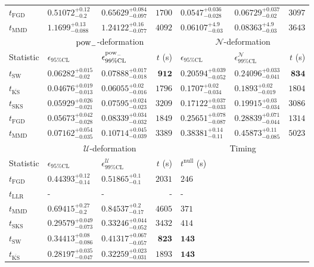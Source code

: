 \begin{tabular}{l|llr|llr}
	$t_{\mathrm{FGD}}$ & ${\mathbf{0.51072_{-0.2}^{+0.12}}}$ & ${\mathbf{0.65629_{-0.097}^{+0.084}}}$ & $1700$ & $0.0547_{-0.028}^{+0.036}$ & ${\mathbf{0.06729_{-0.02}^{+0.037}}}$ & $3097$ \\
	$t_{\mathrm{MMD}}$ & $1.1699_{-0.088}^{+0.13}$ & $1.24122_{-0.077}^{+0.16}$ & $4092$ & $0.06107_{-0.03}^{+4.9}$ & $0.08363_{-0.03}^{+4.9}$ & $3643$ \\
	\toprule
	\multicolumn{1}{c}{} & \multicolumn{3}{c}{$\rm{pow}_{-}$-deformation} & \multicolumn{3}{c}{$\mathcal{N}$-deformation} \\
	Statistic & $\epsilon_{95\%\mathrm{CL}}$ & $\epsilon^  {\rm{pow}_{-}}_{99\%\mathrm{CL}}$ & $t$ (s) & $\epsilon_{95\%\mathrm{CL}}$ & $\epsilon^    {\mathcal{N}}_{99\%\mathrm{CL}}$ & $t$ (s) \\
	\midrule
	$t_{\mathrm{SW}}$ & $0.06282_{-0.02}^{+0.015}$ & $0.07888_{-0.018}^{+0.017}$ & ${\mathbf{912}}$ & $0.20594_{-0.052}^{+0.039}$ & $0.24096_{-0.041}^{+0.033}$ & ${\mathbf{834}}$ \\
	$t_{\overline{\mathrm{KS}}}$ & ${\mathbf{0.04676_{-0.013}^{+0.019}}}$ & ${\mathbf{0.06055_{-0.016}^{+0.02}}}$ & $1796$ & ${\mathbf{0.1707_{-0.034}^{+0.02}}}$ & ${\mathbf{0.1893_{-0.019}^{+0.02}}}$ & $1804$ \\
	$t_{\mathrm{SKS}}$ & $0.05929_{-0.021}^{+0.026}$ & $0.07595_{-0.023}^{+0.024}$ & $3209$ & $0.17122_{-0.033}^{+0.037}$ & $0.19915_{-0.034}^{+0.03}$ & $3086$ \\
	$t_{\mathrm{FGD}}$ & $0.05673_{-0.028}^{+0.042}$ & $0.08339_{-0.032}^{+0.034}$ & $1849$ & $0.25651_{-0.087}^{+0.078}$ & $0.28839_{-0.044}^{+0.071}$ & $1314$ \\
	$t_{\mathrm{MMD}}$ & $0.07162_{-0.035}^{+0.054}$ & $0.10714_{-0.039}^{+0.045}$ & $3389$ & $0.38381_{-0.11}^{+0.14}$ & $0.45873_{-0.085}^{+0.11}$ & $5023$ \\
	\toprule
	\multicolumn{1}{c}{} & \multicolumn{3}{c}{$\mathcal{U}$-deformation} & \multicolumn{3}{c}{Timing} \\
	Statistic & $\epsilon_{95\%\mathrm{CL}}$ & $\epsilon^    {\mathcal{U}}_{99\%\mathrm{CL}}$ & $t$ (s) & $t^{\mathrm{null}}$ (s) \\
	\midrule
	$t_{\mathrm{FGD}}$ & $0.44393_{-0.14}^{+0.12}$ & $0.51865_{-0.1}^{+0.1}$ & $2031$ & $246$ \\
	$t_{\mathrm{LLR}}$ & - & - & - & - \\
	$t_{\mathrm{MMD}}$ & $0.69415_{-0.2}^{+0.27}$ & $0.84537_{-0.17}^{+0.2}$ & $4605$ & $371$ \\
	$t_{\mathrm{SKS}}$ & $0.29579_{-0.073}^{+0.049}$ & $0.33246_{-0.052}^{+0.044}$ & $3432$ & $414$ \\
	$t_{\mathrm{SW}}$ & $0.34413_{-0.086}^{+0.08}$ & $0.41317_{-0.057}^{+0.067}$ & ${\mathbf{823}}$ & ${\mathbf{143}}$ \\
	$t_{\overline{\mathrm{KS}}}$ & ${\mathbf{0.28197_{-0.047}^{+0.035}}}$ & ${\mathbf{0.32259_{-0.031}^{+0.023}}}$ & $1893$ & ${\mathbf{143}}$ \\
	\bottomrule
\end{tabular}